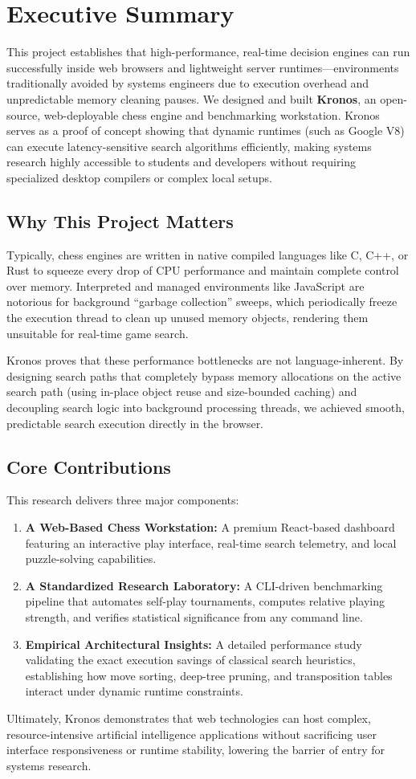 \section*{Executive Summary}

This project establishes that high-performance, real-time decision engines can run successfully inside web browsers and lightweight server runtimes---environments traditionally avoided by systems engineers due to execution overhead and unpredictable memory cleaning pauses. We designed and built \textbf{Kronos}, an open-source, web-deployable chess engine and benchmarking workstation. Kronos serves as a proof of concept showing that dynamic runtimes (such as Google V8) can execute latency-sensitive search algorithms efficiently, making systems research highly accessible to students and developers without requiring specialized desktop compilers or complex local setups.

\subsection*{Why This Project Matters}
Typically, chess engines are written in native compiled languages like C, C++, or Rust to squeeze every drop of CPU performance and maintain complete control over memory. Interpreted and managed environments like JavaScript are notorious for background ``garbage collection'' sweeps, which periodically freeze the execution thread to clean up unused memory objects, rendering them unsuitable for real-time game search. 

Kronos proves that these performance bottlenecks are not language-inherent. By designing search paths that completely bypass memory allocations on the active search path (using in-place object reuse and size-bounded caching) and decoupling search logic into background processing threads, we achieved smooth, predictable search execution directly in the browser. 

\subsection*{Core Contributions}
This research delivers three major components:
\begin{enumerate}
    \item \textbf{A Web-Based Chess Workstation:} A premium React-based dashboard featuring an interactive play interface, real-time search telemetry, and local puzzle-solving capabilities.
    \item \textbf{A Standardized Research Laboratory:} A CLI-driven benchmarking pipeline that automates self-play tournaments, computes relative playing strength, and verifies statistical significance from any command line.
    \item \textbf{Empirical Architectural Insights:} A detailed performance study validating the exact execution savings of classical search heuristics, establishing how move sorting, deep-tree pruning, and transposition tables interact under dynamic runtime constraints.
\end{enumerate}

Ultimately, Kronos demonstrates that web technologies can host complex, resource-intensive artificial intelligence applications without sacrificing user interface responsiveness or runtime stability, lowering the barrier of entry for systems research.
